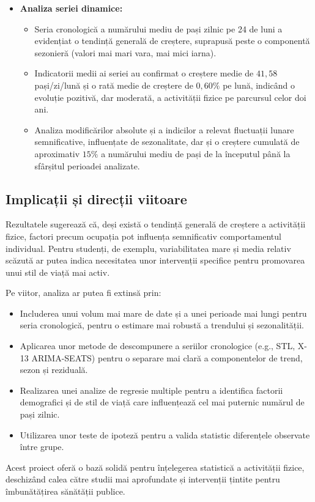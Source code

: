 \documentclass[12pt,a4paper]{report}
\begin{document}
\begin{itemize}
    \item \textbf{Analiza seriei dinamice:}
    \begin{itemize}
        \item Seria cronologică a numărului mediu de pași zilnic pe 24 de luni a evidențiat o tendință generală de creștere, suprapusă peste o componentă sezonieră (valori mai mari vara, mai mici iarna).
        \item Indicatorii medii ai seriei au confirmat o creștere medie de \(41{,}58\) pași/zi/lună și o rată medie de creștere de \(0{,}60\%\) pe lună, indicând o evoluție pozitivă, dar moderată, a activității fizice pe parcursul celor doi ani.
        \item Analiza modificărilor absolute și a indicilor a relevat fluctuații lunare semnificative, influențate de sezonalitate, dar și o creștere cumulată de aproximativ \(15\%\) a numărului mediu de pași de la începutul până la sfârșitul perioadei analizate.
    \end{itemize}
\end{itemize}

\subsection*{Implicații și direcții viitoare}

Rezultatele sugerează că, deși există o tendință generală de creștere a activității fizice, factori precum ocupația pot influența semnificativ comportamentul individual. Pentru studenți, de exemplu, variabilitatea mare și media relativ scăzută ar putea indica necesitatea unor intervenții specifice pentru promovarea unui stil de viață mai activ.

Pe viitor, analiza ar putea fi extinsă prin:
\begin{itemize}
    \item Includerea unui volum mai mare de date și a unei perioade mai lungi pentru seria cronologică, pentru o estimare mai robustă a trendului și sezonalității.
    \item Aplicarea unor metode de descompunere a seriilor cronologice (e.g., STL, X-13 ARIMA-SEATS) pentru o separare mai clară a componentelor de trend, sezon și reziduală.
    \item Realizarea unei analize de regresie multiple pentru a identifica factorii demografici și de stil de viață care influențează cel mai puternic numărul de pași zilnic.
    \item Utilizarea unor teste de ipoteză pentru a valida statistic diferențele observate între grupe.
\end{itemize}

Acest proiect oferă o bază solidă pentru înțelegerea statistică a activității fizice, deschizând calea către studii mai aprofundate și intervenții țintite pentru îmbunătățirea sănătății publice.
\end{document}
